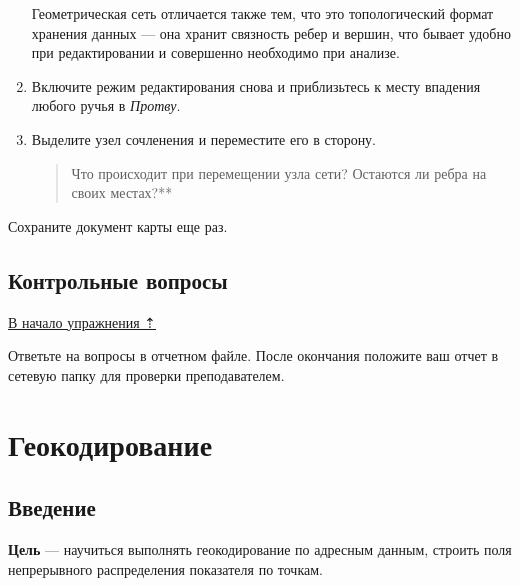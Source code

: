 \documentclass[]{book}
\theoremstyle{definition}
\theoremstyle{definition}
\theoremstyle{definition}
\theoremstyle{remark}
\begin{document}
\begin{enumerate}
  Геометрическая сеть отличается также тем, что это топологический
  формат хранения данных --- она хранит связность ребер и вершин, что
  бывает удобно при редактировании и совершенно необходимо при анализе.
\item
  Включите режим редактирования снова и приблизьтесь к месту впадения
  любого ручья в \emph{Протву}.
\item
  Выделите узел сочленения и переместите его в сторону.

  \begin{quote}
  Что происходит при перемещении узла сети? Остаются ли ребра на своих
  местах?**
  \end{quote}
\end{enumerate}

Сохраните документ карты еще раз.

\hypertarget{network-hydro-questions}{%
\section{Контрольные вопросы}\label{network-hydro-questions}}

\protect\hyperlink{network-modeling-hydro}{В начало упражнения ⇡}

Ответьте на вопросы в отчетном файле. После окончания положите ваш отчет
в сетевую папку для проверки преподавателем.

\hypertarget{geocoding}{%
\chapter{Геокодирование}\label{geocoding}}

\hypertarget{geocoding-intro}{%
\section{Введение}\label{geocoding-intro}}

\textbf{Цель} --- научиться выполнять геокодирование по адресным данным,
строить поля непрерывного распределения показателя по точкам.
\end{document}
